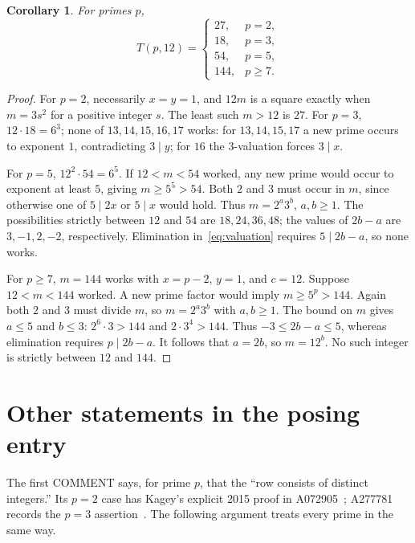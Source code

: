 \documentclass[11pt]{article}
\newtheorem{corollary}[theorem]{Corollary}
\begin{document}
\begin{corollary}\label{cor:column}
For primes $p$,
\[
 T(p,12)=
 \begin{cases}
 27,&p=2,\\
 18,&p=3,\\
 54,&p=5,\\
 144,&p\ge7.
 \end{cases}
\]
\end{corollary}
\begin{proof}
For $p=2$, necessarily $x=y=1$, and $12m$ is a square exactly when
$m=3s^2$ for a positive integer $s$. The least such $m>12$ is $27$.
For $p=3$, $12\cdot18=6^3$; none of $13,14,15,16,17$ works:
for $13,14,15,17$ a new prime occurs to exponent $1$, contradicting
$3\mid y$; for $16$ the $3$-valuation forces $3\mid x$.

For $p=5$, $12^2\cdot54=6^5$.
If $12<m<54$ worked, any new prime would occur to exponent at least $5$,
giving $m\ge5^5>54$. Both $2$ and $3$ must occur in $m$, since otherwise
one of $5\mid 2x$ or $5\mid x$ would hold. Thus $m=2^a3^b$, $a,b\ge1$.
The possibilities strictly between $12$ and $54$ are $18,24,36,48$;
the values of $2b-a$ are $3,-1,2,-2$, respectively.
Elimination in~\eqref{eq:valuation} requires $5\mid2b-a$, so none works.

For $p\ge7$, $m=144$ works with $x=p-2$, $y=1$, and $c=12$.
Suppose $12<m<144$ worked. A new prime factor would imply
$m\ge5^p>144$. Again both $2$ and $3$ must divide $m$, so
$m=2^a3^b$ with $a,b\ge1$. The bound on $m$ gives $a\le5$ and $b\le3$:
$2^6\cdot3>144$ and $2\cdot3^4>144$.
Thus $-3\le2b-a\le5$, whereas elimination requires $p\mid2b-a$.
It follows that $a=2b$, so $m=12^b$. No such integer is strictly
between $12$ and $144$.
\end{proof}

\section{Other statements in the posing entry}
The first COMMENT says, for prime $p$, that the
``row consists of distinct integers.''
Its $p=2$ case has Kagey's explicit 2015 proof in A072905~\cite{a072905};
A277781 records the $p=3$ assertion~\cite{a277781}.
The following argument treats every prime in the same way.
\end{document}
